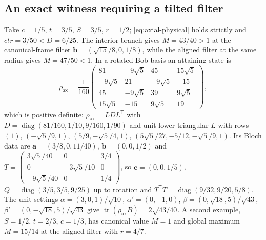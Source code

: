 \documentclass[11pt]{article}
\theoremstyle{remark}\newtheorem{remark}[theorem]{Remark}
\DeclareMathOperator{\tr}{tr}\DeclareMathOperator{\diag}{diag}
\newcommand{\cv}{\bm c}\newcommand{\av}{\bm a}\newcommand{\bv}{\bm b}
\begin{document}
\subsection{An exact witness requiring a tilted filter}\label{sec:axial-witness}
Take $c=1/5$, $t=3/5$, $S=3/5$, $r=1/2$; \eqref{eq:axial-physical} holds
strictly and $ctr=3/50<D=6/25$. The interior branch gives $M=43/40>1$ at the
canonical-frame filter $\bv=(\sqrt{15}/8,0,1/8)$, while the aligned filter at
the same radius gives $M=47/50<1$. In a rotated Bob basis an attaining state is
\begin{equation}\label{eq:axial-witness}
 \rho_{\mathrm{ax}}=\frac1{160}\begin{pmatrix}
 81&-9\sqrt5&45&15\sqrt5\\
 -9\sqrt5&21&-9\sqrt5&-15\\
 45&-9\sqrt5&39&9\sqrt5\\
 15\sqrt5&-15&9\sqrt5&19
 \end{pmatrix},
\end{equation}
which is positive definite: $\rho_{\mathrm{ax}}=LDL^{\mathsf T}$ with
$D=\diag(81/160,1/10,9/160,1/90)$ and unit lower-triangular
$L$ with rows $(1)$, $(-\sqrt5/9,1)$, $(5/9,-\sqrt5/4,1)$,
$(5\sqrt5/27,-5/12,-\sqrt5/9,1)$. Its Bloch data are $\av=(3/8,0,11/40)$,
$\bv=(0,0,1/2)$ and
$T=\left(\begin{smallmatrix}3\sqrt5/40&0&3/4\\0&-3\sqrt5/10&0\\-9\sqrt5/40&0&1/4\end{smallmatrix}\right)$,
so $\cv=(0,0,1/5)$, $Q=\diag(3/5,3/5,9/25)$ up to rotation and
$T^{\mathsf T}T=\diag(9/32,9/20,5/8)$. The unit settings
$\alpha=(3,0,1)/\sqrt{10}$, $\alpha'=(0,-1,0)$,
$\beta=(0,\sqrt{18},5)/\sqrt{43}$, $\beta'=(0,-\sqrt{18},5)/\sqrt{43}$ give
$\tr(\rho_{\mathrm{ax}}B)=2\sqrt{43/40}$. A second example, $S=1/2$, $t=2/3$,
$c=1/3$, has canonical value $M=1$ and global maximum $M=15/14$ at the aligned
filter with $r=4/7$.
\end{document}
